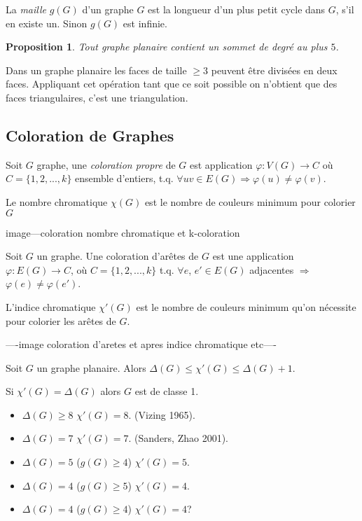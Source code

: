 \documentclass{beamer}
\newtheorem{proposition}{Proposition}
\begin{document}
\begin{frame}
La \emph{maille} $g(G)$ d'un graphe $G$ est la longueur d'un plus petit cycle dans $G$, s'il en existe un. Sinon $g(G)$ est infinie.

\pause

\begin{proposition}
Tout graphe planaire contient un sommet de degré au plus $5$.
\end{proposition}

\pause

Dans un graphe planaire les faces de taille $\geq 3$ peuvent être divisées en deux faces. Appliquant cet opération tant que ce soit possible on n'obtient que des faces triangulaires, c'est une triangulation.

\end{frame}

\subsection{Coloration de Graphes}
\begin{frame}
Soit $G$ graphe, une \emph{coloration propre} de $G$ est application $\varphi: V(G) \to C$ où $C=\{1,2,...,k\}$ ensemble d'entiers, t.q. $\forall uv\in E(G) \Rightarrow \varphi(u) \neq \varphi(v)$. 

Le nombre chromatique $\chi(G)$ est le nombre de couleurs minimum pour colorier $G$

image---coloration nombre chromatique et k-coloration

\end{frame}
\begin{frame}
Soit $G$ un graphe. Une coloration d'arêtes de $G$ est une application $\varphi:E(G) \to C$, où $C=\{1,2,...,k\}$ t.q. $\forall e$, $e' \in E(G)$ adjacentes $\Rightarrow$ $\varphi(e) \neq \varphi(e')$. 

L'indice chromatique $\chi'(G)$ est le nombre de couleurs minimum qu'on nécessite pour colorier les arêtes de $G$.

----image coloration d'aretes et apres indice chromatique etc----
\end{frame}

\begin{frame}
\begin{theorem}[Vizing]
Soit $G$ un graphe planaire. Alors $\Delta(G) \leq \chi'(G) \leq \Delta(G) + 1$.

Si $\chi'(G) = \Delta(G)$ alors $G$ est de classe 1.
\end{theorem}
\pause

\begin{itemize}
\item $\Delta(G) \geq 8$ $\chi'(G)=8$. (Vizing 1965).
\item $\Delta(G) = 7$  $\chi'(G)=7$. (Sanders, Zhao 2001).
\item $\Delta(G) = 5$ ($g(G) \geq 4$) $\chi'(G) = 5$.
\item $\Delta(G) = 4$ ($g(G) \geq 5$) $\chi'(G) = 4$.
\item $\Delta(G) = 4$ ($g(G) \geq 4$) $\chi'(G) = 4$?
\end{itemize}


\end{frame}
\end{document}

